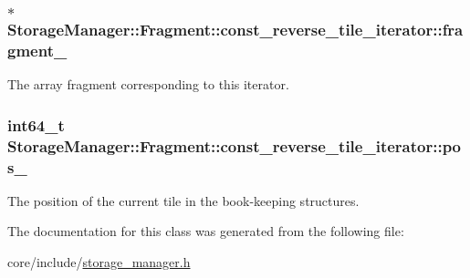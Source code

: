 \subsubsection[{fragment\+\_\+}]{$\ast$ Storage\+Manager\+::\+Fragment\+::const\+\_\+reverse\+\_\+tile\+\_\+iterator\+::fragment\+\_\+\hspace{0.3cm}{\ttfamily [private]}}\label{classStorageManager_1_1Fragment_1_1const__reverse__tile__iterator_a877b80928d750c0a61d04dcc731419f7}
The array fragment corresponding to this iterator. \hypertarget{classStorageManager_1_1Fragment_1_1const__reverse__tile__iterator_afd9408dff860daf1244b0a29eac3d2ed}{}
\subsubsection[{pos\+\_\+}]{\setlength{\rightskip}{0pt plus 5cm}int64\+\_\+t Storage\+Manager\+::\+Fragment\+::const\+\_\+reverse\+\_\+tile\+\_\+iterator\+::pos\+\_\+\hspace{0.3cm}{\ttfamily [private]}}\label{classStorageManager_1_1Fragment_1_1const__reverse__tile__iterator_afd9408dff860daf1244b0a29eac3d2ed}
The position of the current tile in the book-\/keeping structures. 

The documentation for this class was generated from the following file\+:\begin{DoxyCompactItemize}
\item 
core/include/\hyperlink{storage__manager_8h}{storage\+\_\+manager.\+h}\end{DoxyCompactItemize}

